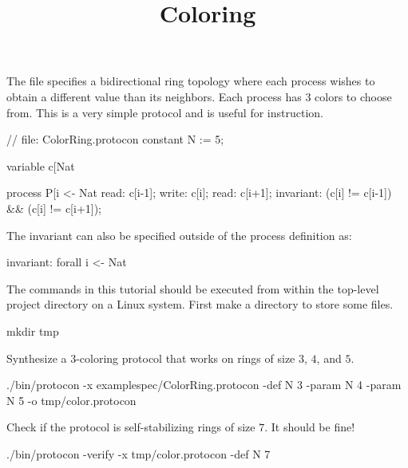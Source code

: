 
\title{Coloring}
\date{}



The  file specifies a bidirectional ring topology where each process wishes to obtain a different value than its neighbors.
Each process has $3$ colors to choose from.
This is a very simple protocol and is useful for instruction.

\begin{code}
// file: ColorRing.protocon
constant N := 5;

variable c[Nat %

process P[i <- Nat %
{
  read: c[i-1];
  write: c[i];
  read: c[i+1];
  invariant: (c[i] != c[i-1]) && (c[i] != c[i+1]);
}
\end{code}
The invariant can also be specified outside of the process definition as:
\begin{code}
invariant: forall i <- Nat %
\end{code}

The commands in this tutorial should be executed from within the top-level project directory on a Linux system.
First make a directory  to store some files.
\begin{code}
mkdir tmp
\end{code}

Synthesize a 3-coloring protocol that works on rings of size $3$, $4$, and $5$.
\begin{code}
./bin/protocon -x examplespec/ColorRing.protocon -def N 3 -param N 4 -param N 5 -o tmp/color.protocon
\end{code}

Check if the protocol is self-stabilizing rings of size $7$. It should be fine!
\begin{code}
./bin/protocon -verify -x tmp/color.protocon -def N 7
\end{code}

